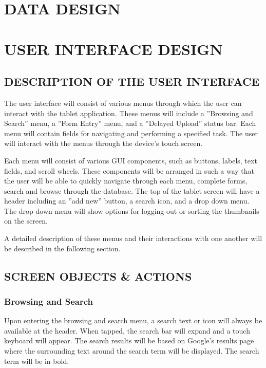 \documentclass[twoside,letterpaper]{article}
\begin{document}
{\clearpage\section[DATA DESIGN]{\rmfamily\bfseries\color{black}
DATA DESIGN}

\clearpage\section[USER INTERFACE DESIGN]{\rmfamily\bfseries\color{black}
USER INTERFACE DESIGN}

\subsection[DESCRIPTION OF THE USER INTERFACE]{\rmfamily\bfseries\color{black}
DESCRIPTION OF THE USER INTERFACE}
{\rmfamily\color{black}
The user interface will consist of various menus through which the user can interact with the tablet application. These menus will include a ''Browsing and Search'' menu, a ''Form Entry'' menu, and a ''Delayed Upload'' status bar. Each menu will contain fields for navigating and performing a specified task. The user will interact with the menus through the device's touch screen. 
\newline

\noindent Each menu will consist of various GUI components, such as buttons, labels, text fields, and scroll wheels. These components will be arranged in such a way that the user will be able to quickly navigate through each menu, complete forms, search and browse through the database. 
The top of the tablet screen will have a header including an ''add new'' button, a search icon, and a drop down menu. The drop down menu will show options for logging out or sorting the thumbnails on the screen.
\newline

\noindent A detailed description of these menus and their interactions with one another will be described in the following section.
}
\newpage
\subsection[SCREEN OBJECTS \& ACTIONS]{\rmfamily\bfseries\color{black}
SCREEN OBJECTS \& ACTIONS}
\subsubsection[Browsing and Search]{\rmfamily\bfseries\color{black}
Browsing and Search}
Upon entering the browsing and search menu, a search text or icon will always be available at the header. When tapped, the search bar will expand and a touch keyboard will appear. The search results will be based on Google's results page where the surrounding text around the search term will be displayed. The search term will be in bold.
\newline

}
\end{document}
